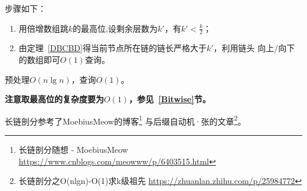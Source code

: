 步骤如下：
\begin{enumerate}
	\item 用倍增数组跳$k$的最高位,设剩余层数为$k'$，有$k'<\frac{k}{2}$；
	\item 由定理~\ref{DBCBD}得当前节点所在链的链长严格大于$k'$，利用链头
	      向上/向下的数组即可$O(1)$查询。
\end{enumerate}

预处理$O(n\lg n)$，查询$O(1)$。

{\bfseries 注意取最高位的复杂度要为$O(1)$，参见~\ref{Bitwise}节。}

长链剖分参考了MoebiusMeow的博客\footnote{长链剖分随想 - MoebiusMeow
	\url{https://www.cnblogs.com/meowww/p/6403515.html}
}
与后缀自动机·张的文章\footnote{长链剖分之O(nlgn)-O(1)求k级祖先
	\url{https://zhuanlan.zhihu.com/p/25984772}
}。
